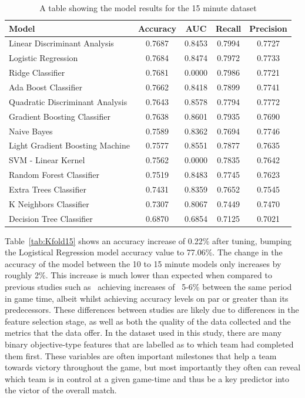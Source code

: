 \begin{table}[h]
    \centering
    \caption{A table showing the model results for the 15 minute dataset}
    \begin{tabular}{l c c c c }
        \toprule
        \textbf{Model} & \textbf{Accuracy} & \textbf{AUC} & \textbf{Recall} & \textbf{Precision} \\
        \midrule
        Linear Discriminant Analysis & 0.7687 & 0.8453 & 0.7994 & 0.7727 \\
        Logistic Regression & 0.7684 & 0.8474 & 0.7972 & 0.7733  \\
        Ridge Classifier & 0.7681 & 0.0000 & 0.7986 & 0.7721  \\
        Ada Boost Classifier & 0.7662 & 0.8418 & 0.7899 & 0.7741   \\
        Quadratic Discriminant Analysis & 0.7643 & 0.8578 & 0.7794 & 0.7772  \\
        Gradient Boosting Classifier & 0.7638 & 0.8601 & 0.7935 & 0.7690  \\
        Naive Bayes & 0.7589 & 0.8362 & 0.7694 & 0.7746  \\
        Light Gradient Boosting Machine & 0.7577 & 0.8551 & 0.7877 & 0.7635  \\
        SVM - Linear Kernel & 0.7562 & 0.0000 & 0.7835 & 0.7642 \\
        Random Forest Classifier & 0.7519 & 0.8483 & 0.7745 & 0.7623  \\
        Extra Trees Classifier & 0.7431 & 0.8359 & 0.7652 & 0.7545  \\
        K Neighbors Classifier & 0.7307 & 0.8067 & 0.7449 & 0.7470  \\
        Decision Tree Classifier & 0.6870 & 0.6854 & 0.7125 & 0.7021  \\
        \bottomrule
    \end{tabular}
    \label{tab:ModelResults15}
\end{table}

Table~\ref{tab:Kfold15} shows an accuracy increase of 0.22\% after tuning, bumping the Logistical Regression model accuracy value to 77.06\%.
The change in the accuracy of the model between the 10 to 15 minute models only increases by roughly 2\%.
This increase is much lower than expected when compared to previous studies such as~\citet{silva2018continuous, lee2020predicting} achieving increases of ~5-6\% between the same period in game time, albeit whilst achieving accuracy levels on par or greater than its predecessors.
These differences between studies are likely due to differences in the feature selection stage, as well as both the quality of the data collected and the metrics that the data offer.
In the dataset used in this study, there are many binary objective-type features that are labelled as to which team had completed them first.
These variables are often important milestones that help a team towards victory throughout the game, but most importantly they often can reveal which team is in control at a given game-time and thus be a key predictor into the victor of the overall match. \\

